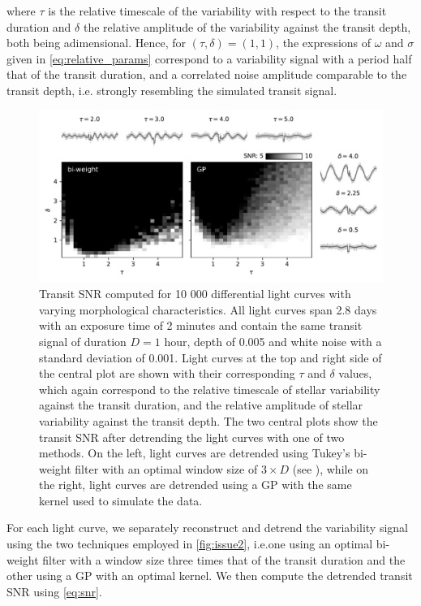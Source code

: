 \documentclass[modern]{aastex631}
\begin{document}
where $\tau$ is the relative timescale of the variability with respect to the transit duration and $\delta$ the relative amplitude of the variability against the transit depth, both being adimensional. Hence, for $(\tau, \delta)=(1, 1)$, the expressions of $\omega$ and $\sigma$ given in \autoref{eq:relative_params} correspond to a variability signal with a period half that of the transit duration, and a correlated noise amplitude comparable to the transit depth, i.e. strongly resembling the simulated transit signal.
\begin{figure}[H]
    \begin{centering}
        \includegraphics[width=\linewidth]{../workflows/cleaning_snr/figures/result.pdf}
        \caption{Transit SNR computed for 10 000 differential light curves with varying morphological characteristics. All light curves span 2.8 days with an exposure time of 2 minutes and contain the same transit signal of  duration $D=1$ hour, depth of 0.005 and white noise with a standard deviation of 0.001. Light curves at the top and right side of the central plot are shown with their corresponding $\tau$ and $\delta$ values, which again correspond to the relative timescale of stellar variability against the transit duration, and the relative amplitude of stellar variability against the transit depth. The two central plots show the transit SNR after detrending the light curves with one of two methods. On the left, light curves are detrended using Tukey's bi-weight filter with an optimal window size of $3\times D$ (see \citealt{wotan}), while on the right, light curves are detrended using a GP with the same kernel used to simulate the data.}
        \label{fig:snr_detrend}
    \end{centering}
\end{figure}
For each light curve, we separately reconstruct and detrend  the variability signal using the two techniques employed in \autoref{fig:issue2}, i.e.\;one using an optimal bi-weight filter with a window size three times that of the transit duration \citep{wotan} and the other using a GP with an optimal kernel. We then compute the detrended transit SNR using \autoref{eq:snr}.\\\\
\end{document}
